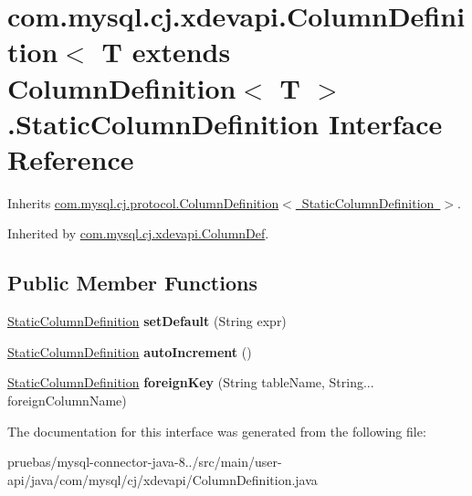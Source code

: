 \hypertarget{interfacecom_1_1mysql_1_1cj_1_1xdevapi_1_1_column_definition_1_1_static_column_definition}{}\section{com.\+mysql.\+cj.\+xdevapi.\+Column\+Definition$<$ T extends Column\+Definition$<$ T $>$.Static\+Column\+Definition Interface Reference}
\label{interfacecom_1_1mysql_1_1cj_1_1xdevapi_1_1_column_definition_1_1_static_column_definition}


Inherits \mbox{\hyperlink{interfacecom_1_1mysql_1_1cj_1_1protocol_1_1_column_definition}{com.\+mysql.\+cj.\+protocol.\+Column\+Definition$<$ Static\+Column\+Definition $>$}}.



Inherited by \mbox{\hyperlink{classcom_1_1mysql_1_1cj_1_1xdevapi_1_1_column_def}{com.\+mysql.\+cj.\+xdevapi.\+Column\+Def}}.

\subsection*{Public Member Functions}
\begin{DoxyCompactItemize}
\item 
\mbox{\label{interfacecom_1_1mysql_1_1cj_1_1xdevapi_1_1_column_definition_1_1_static_column_definition_a0ac0436ab3288cb50a8dd10f4a9c8afc}} 
\mbox{\hyperlink{interfacecom_1_1mysql_1_1cj_1_1xdevapi_1_1_column_definition_1_1_static_column_definition}{Static\+Column\+Definition}} {\bfseries set\+Default} (String expr)
\item 
\mbox{\label{interfacecom_1_1mysql_1_1cj_1_1xdevapi_1_1_column_definition_1_1_static_column_definition_acc7d2520272cb72fb38d458464886995}} 
\mbox{\hyperlink{interfacecom_1_1mysql_1_1cj_1_1xdevapi_1_1_column_definition_1_1_static_column_definition}{Static\+Column\+Definition}} {\bfseries auto\+Increment} ()
\item 
\mbox{\label{interfacecom_1_1mysql_1_1cj_1_1xdevapi_1_1_column_definition_1_1_static_column_definition_a38a6faaed72d2f87e2d724da689fe8d2}} 
\mbox{\hyperlink{interfacecom_1_1mysql_1_1cj_1_1xdevapi_1_1_column_definition_1_1_static_column_definition}{Static\+Column\+Definition}} {\bfseries foreign\+Key} (String table\+Name, String... foreign\+Column\+Name)
\end{DoxyCompactItemize}


The documentation for this interface was generated from the following file\+:\begin{DoxyCompactItemize}
\item 
pruebas/mysql-\/connector-\/java-\/8../src/main/user-\/api/java/com/mysql/cj/xdevapi/Column\+Definition.\+java\end{DoxyCompactItemize}
